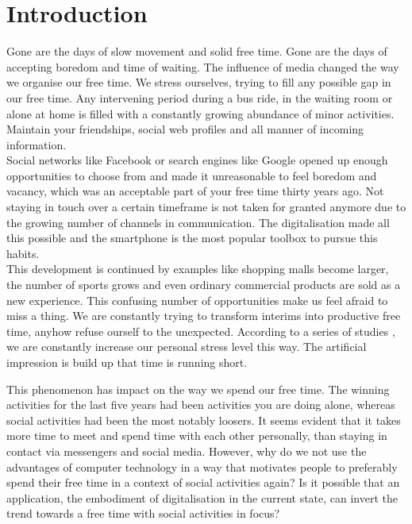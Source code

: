 \documentclass[12pt,numbers=noenddot,parskip,bibliography=totocnumbered,listof=totocnumbered]{scrreprt}
\begin{document}
\chapter{Introduction}
Gone are the days of slow movement and solid free time. Gone are the days of accepting boredom and time of waiting. The influence of media changed the way we organise our free time. We stress ourselves, trying to fill any possible gap in our free time. Any intervening period during a bus ride, in the waiting room or alone at home is filled with a constantly growing abundance of minor activities. Maintain your friendships, social web profiles and all manner of incoming information. \\
Social networks like Facebook or search engines like Google opened up enough opportunities to choose from and made it unreasonable to feel boredom and vacancy, which was an acceptable part of your free time thirty years ago. Not staying in touch over a certain timeframe is not taken for granted anymore due to the growing number of channels in communication. The digitalisation made all this possible and the smartphone is the most popular toolbox to pursue this habits. \\
This development is continued by examples like shopping malls become larger, the number of sports grows and even ordinary commercial products are sold as a new experience. This confusing number of opportunities make us feel afraid to miss a thing. We are constantly trying to transform interims into productive free time, anyhow refuse ourself to the unexpected. According to a series of studies \citep{freizeitmonitor}, we are constantly increase our personal stress level this way. The artificial impression is build up that time is running short. 

This phenomenon has impact on the way we spend our free time. The winning activities for the last five years had been activities you are doing alone, whereas social activities had been the most notably loosers. It seems evident that it takes more time to meet and spend time with each other personally, than staying in contact via messengers and social media. However, why do we not use the advantages of computer technology in a way that motivates people to preferably spend their free time in a context of social activities again? Is it possible that an application, the embodiment of digitalisation in the current state, can invert the trend towards a free time with social activities in focus?
\end{document}
